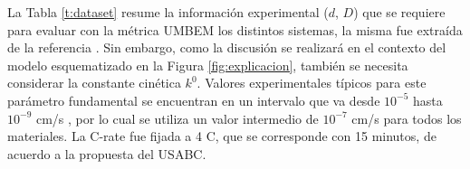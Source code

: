 La Tabla \ref{t:dataset} resume la información experimental ($d$, $D$) que se 
requiere para evaluar con la métrica UMBEM los distintos sistemas, la misma fue 
extraída de la referencia \cite{xia2022}. Sin embargo, como la discusión se 
realizará en el contexto del modelo esquematizado en la Figura 
\ref{fig:explicacion}, también se necesita considerar la constante cinética $k^0$.
Valores experimentales típicos para este parámetro fundamental se encuentran en 
un intervalo que va desde $10^{-5}$ hasta $10^{-9}$ cm/s \cite{gavilan2020kinetic}, 
por lo cual se utiliza un valor intermedio de $10^{-7}$ cm/s para todos los 
materiales. La C-rate fue fijada a 4 C, que se corresponde con 15 minutos, 
de acuerdo a la propuesta del USABC. 
\begin{table}[h!]
    \centering
    \caption{Datos experimentales de distintos sistemas requeridos para evaluar 
    la métrica UMBEM.}
    \setlength\extrarowheight{2pt}
\end{table}
